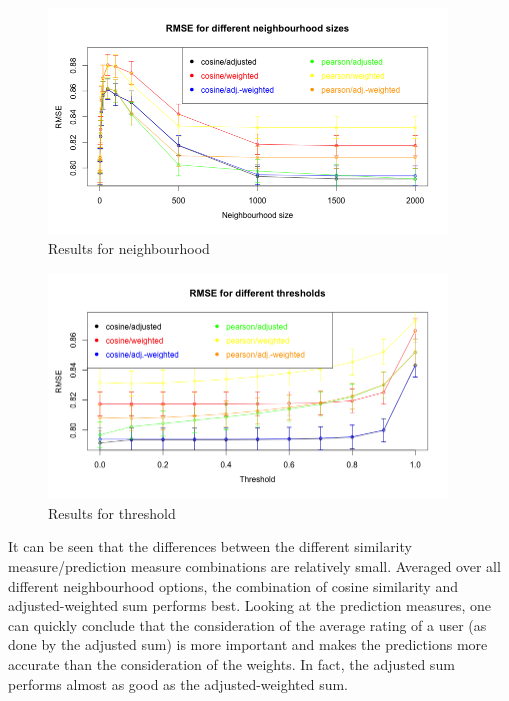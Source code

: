 \begin{figure}[!ht]
\centering
\includegraphics[width=400px]{./4-experiments/figures/USERBASED_N_V3.png}
\caption{Results for neighbourhood}
\label{f:userbasedn}
\end{figure}

\begin{figure}[!ht]
\includegraphics[width=400px]{./4-experiments/figures/USERBASED_T_V3.png}
\caption{Results for threshold}
\label{f:userbasedt}
\end{figure}

It can be seen that the differences between the different similarity measure/prediction measure combinations are relatively small. Averaged over all different neighbourhood options, the combination of cosine similarity and adjusted-weighted sum performs best. Looking at the prediction measures, one can quickly conclude that the consideration of the average rating of a user (as done by the adjusted sum) is more important and makes the predictions more accurate than the consideration of the weights. In fact, the adjusted sum performs almost as good as the adjusted-weighted sum.

